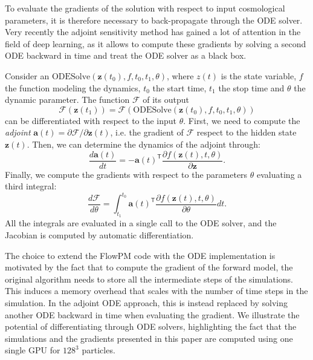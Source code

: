 \documentclass{aa}
\begin{document}
To evaluate the gradients of the solution with respect to input cosmological parameters, it is therefore necessary to  back-propagate through the ODE solver. Very recently the adjoint sensitivity method \cite{chen2018neural, pontryaginmathematical} has gained a lot of attention in the field of deep learning, as it allows to compute these gradients by solving a second ODE backward in time and treat the ODE solver as a black box. 
 
Consider an $\text{ODESolve}(\textbf{z}(t_0),f,t_0,t_1, \theta)$, 
 where $z(t)$ is the state variable, $f$ the function modeling the dynamics, $t_0$ the start time, $t_1$ the stop time and $\theta$ the dynamic parameter. The function  $\mathcal{F}$ of its output
 \begin{equation}
     \mathcal{F}(\textbf{z}(t_1))=   \mathcal{F} (\text{ODESolve}(\textbf{z}(t_0),f,t_0,t_1, \theta))
 \end{equation}
can be differentiated with respect to the input $\theta$.
 First, we need to compute the \textit{adjoint} $\textbf{a}(t)=\partial \mathcal{F}/ \partial \textbf{z}(t)$, i.e. the gradient of $\mathcal{F}$ respect to the hidden state $\textbf{z}(t)$.  
 Then, we can determine the dynamics of the adjoint through:
 \begin{equation}
     \frac{d \textbf{a}(t)}{dt}=-\textbf{a}(t)^{ \mathsf{T}}\frac{\partial f (\textbf{z}(t),t,\theta)}{\partial \textbf{z}}.
 \end{equation}
 Finally, we compute the gradients with respect to the parameters $\theta$ evaluating a third integral:
 \begin{equation}
     \frac{d\mathcal{F}}{d\theta}=
     \int_{t_1}^{t_0} \textbf{a}(t)^{ \mathsf{T}}
     \frac{\partial f (\textbf{z}(t),t,\theta)}{\partial \theta } dt.
 \end{equation}
All the integrals are evaluated in a single call to the ODE solver, and the Jacobian is computed by automatic differentiation. 
 



The choice to extend the FlowPM code with the ODE implementation is motivated by the fact that to compute the gradient of the forward model, the original algorithm needs to store all the intermediate steps of the simulations. This induces a memory overhead that scales with the number of time steps in the simulation. In the adjoint ODE approach, this is instead replaced by solving another ODE backward in time when evaluating the gradient. 
We illustrate the potential of differentiating through ODE solvers, highlighting the fact that the simulations and the gradients presented in this paper are computed using one single GPU for $128^3$ particles. 
\end{document}
